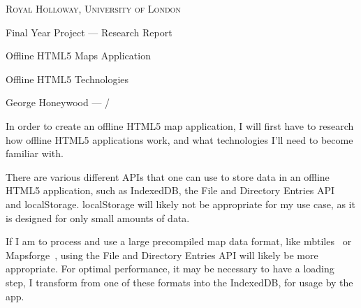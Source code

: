 \documentclass[a4paper,12pt]{article} %
\begin{document}
{
\centering
{\scshape\large Royal Holloway, University of London\par}
\vspace{0.5cm}
{\Huge Final Year Project --- Research Report\par}
\vspace{0.2cm}
{\Large Offline HTML5 Maps Application\par}
\vspace{0.2cm}

{\Huge Offline HTML5 Technologies\par}
\vspace{0.5cm}
{\large George Honeywood --- \the\month/\the\year\par}
\vspace{0.5cm}
}





\pagestyle{fancy} %

In order to create an offline HTML5 map application, I will first have to research how offline HTML5 applications work, and what technologies I'll need to become familiar with.

There are various different APIs that one can use to store data in an offline HTML5 application, such as IndexedDB, the File and Directory Entries API~\cite{w3c-file-directories-api}~\cite{mdn-file-directories-api} and localStorage. localStorage will likely not be appropriate for my use case, as it is designed for only small amounts of data. 

If I am to process and use a large precompiled map data format, like mbtiles~\cite{mbtiles-spec} or Mapsforge~\cite{mapsforge-spec}, using the File and Directory Entries API will likely be more appropriate. For optimal performance, it may be necessary to have a loading step, I transform from one of these formats into the IndexedDB, for usage by the app.


\printbibliography{}
\end{document}
